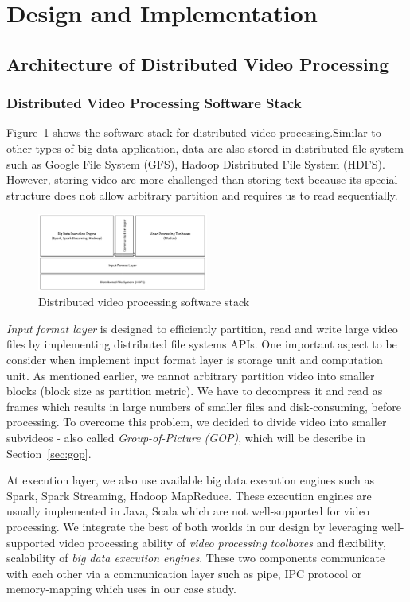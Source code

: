 \section{Design and Implementation}
\label{sec:sec_algorithm}
\subsection{Architecture of Distributed Video Processing}

\subsubsection{Distributed Video Processing Software Stack}
Figure~\ref{fig:stack} shows the software stack for distributed video
processing.Similar to other types of big data application, data are also stored
in distributed file system such as Google File System (GFS)\cite{gfs}, Hadoop
Distributed File System (HDFS)\cite{hdfs}. However, storing video are more
challenged than storing text because its special structure does not allow
arbitrary partition and requires us to read sequentially.
\begin{figure}[htbp!]\centering
\vspace{-1ex}
\includegraphics[width=0.5\textwidth]{figures/softwarestack.pdf}
\vspace{-4ex}
\caption{Distributed video processing software stack}
\label{fig:stack}
\end{figure}
 \textit{Input format
layer} is designed to efficiently partition, read and write large video files by
implementing distributed file systems APIs. One important aspect to be consider
when implement input format layer is storage unit and computation unit. As
mentioned earlier, we cannot arbitrary partition video into smaller blocks
(block size as partition metric). We have to decompress it and read as frames
which results in large numbers of smaller files and disk-consuming, before
processing. To overcome this problem, we decided to divide video into smaller
subvideos - also called \textit{Group-of-Picture (GOP)}, which will be describe
in Section~\ref{sec:gop}. 

At execution layer, we also use available big data execution engines such as
Spark\cite{spark}, Spark Streaming\cite{sparkstreaming}, Hadoop
MapReduce\cite{hadoop}. These execution engines are usually implemented in Java,
Scala which are not well-supported for video processing. We integrate the best
of both worlds in our design by leveraging well-supported video processing
ability of \textit{video processing toolboxes} and flexibility, scalability of
\textit{big data execution engines}. These two components communicate with each
other via a communication layer such as pipe, IPC protocol or memory-mapping which uses in our case study.

